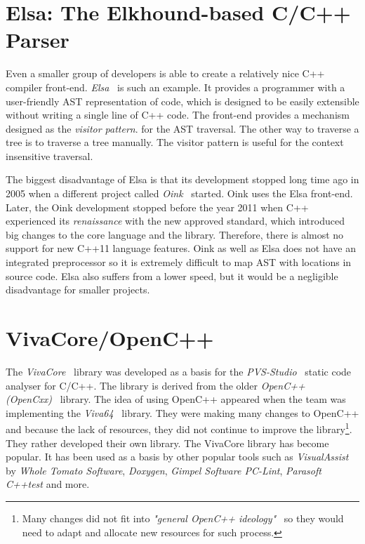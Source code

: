 \section{Elsa: The Elkhound-based C/C++ Parser}
Even a smaller group of developers is able to create a relatively nice C++ compiler front-end. \emph{Elsa}~\cite{elsa} is such an example. It provides a programmer with a user-friendly AST representation of code, which is designed to be easily extensible without writing a single line of C++ code. The front-end provides a mechanism designed as the \emph{visitor pattern}. for the AST traversal. The other way to traverse a tree is to traverse a tree manually. The visitor pattern is useful for the context insensitive traversal.

The biggest disadvantage of Elsa is that its development stopped long time ago in 2005 when a different project called \emph{Oink}~\cite{oink} started. Oink uses the Elsa front-end. Later, the Oink development stopped before the year 2011 when C++ experienced its \textit{renaissance} with the new approved standard, which introduced big changes to the core language and the library. Therefore, there is almost no support for new C++11 language features. Oink as well as Elsa does not have an integrated preprocessor so it is extremely difficult to map AST with locations in source code. Elsa also suffers from a lower speed, but it would be a negligible disadvantage for smaller projects.

\section{VivaCore/OpenC++}
The \emph{VivaCore}~\cite{vivacore} library was developed as a basis for the \emph{PVS-Studio}~\cite{pvs-studio} static code analyser for C/C++. The library is derived from the older \emph{OpenC++ (OpenCxx)}~\cite{opencxx} library. The idea of using OpenC++ appeared when the team was implementing the \emph{Viva64}~\cite{vivacore} library. They were making many changes to OpenC++ and because the lack of resources, they did not continue to improve the library\footnote{Many changes did not fit into \textit{"general OpenC++ ideology"}~\cite{vivacore-ideology} so they would need to adapt and allocate new resources for such process.}. They rather developed their own library. The VivaCore library has become popular. It has been used as a basis by other popular tools such as  \emph{VisualAssist} by \emph{Whole Tomato Software}, \emph{Doxygen}, \emph{Gimpel Software PC-Lint}, \emph{Parasoft C++test} and more.

